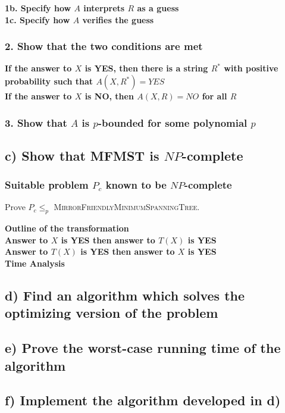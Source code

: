 \documentclass[12pt]{article}
\begin{document}
\textbf{1b. Specify how $A$ interprets $R$ as a guess}\\

\textbf{1c. Specify how $A$ verifies the guess}\\

\subsubsection*{2. Show that the two conditions are met}

\textbf{If the answer to $X$ is YES, then there is a string $R^*$ with positive probability such that $A(X, R^*) = YES$}\\

\textbf{If the answer to $X$ is NO, then $A(X, R) = NO$ for all $R$}\\

\subsubsection*{3. Show that $A$ is $p$-bounded for some polynomial $p$}

\subsection*{c) Show that MFMST is $NP$-complete}
\subsubsection*{Suitable problem $P_c$ known to be $NP$-complete}

Prove $P_c \leq_p$ \textsc{MirrorFriendlyMinimumSpanningTree}.

\textbf{Outline of the transformation}\\

\textbf{Answer to $X$ is YES then answer to $T(X)$ is YES}\\

\textbf{Answer to $T(X)$ is YES then answer to $X$ is YES}\\

\textbf{Time Analysis}

\subsection*{d) Find an algorithm which solves the optimizing version of the problem}


\subsection*{e) Prove the worst-case running time of the algorithm}


\subsection*{f) Implement the algorithm developed in d)}
\end{document}
